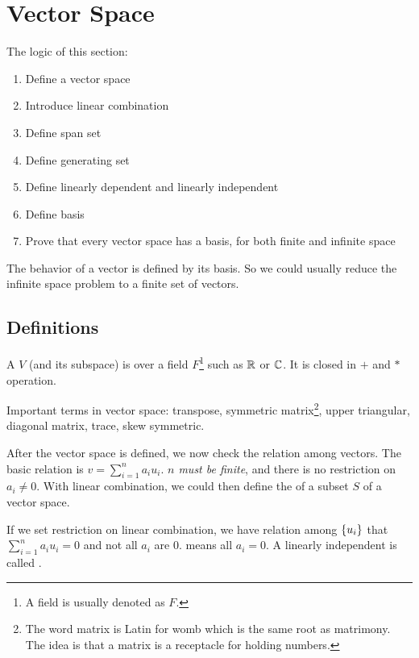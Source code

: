 \chapter{Vector Space}

The logic of this section:
\begin{enumerate}
    \item Define a vector space
    \item Introduce linear combination
    \item Define span set
    \item Define generating set
    \item Define linearly dependent and linearly independent
    \item Define basis
    \item Prove that every vector space has a basis, for both finite and infinite space
\end{enumerate}


The behavior of a vector is defined by its basis. So we could usually reduce the infinite space problem to a finite set of vectors.

\section{Definitions}

\begin{definition}
    A  $V$ (and its subspace) is over a field $F$\footnote{A field is usually denoted as $F$.} such as $\mathbb{R}$ or $\mathbb{C}$. It is closed in $+$ and $*$ operation.
\end{definition}


Important terms in vector space: transpose, symmetric matrix\footnote{The word matrix is Latin for womb which is the same root as matrimony. The idea is that a matrix is a receptacle for holding numbers.}, upper triangular, diagonal matrix, trace, skew symmetric.

After the vector space is defined, we now check the relation among vectors. The basic relation is  $v = \sum_{i=1}^{n} a_i u_i$. \emph{$n$ must be finite}, and there is no restriction on $a_i \neq 0$. With linear combination, we could then define the  of a subset $S$ of a vector space.

If we set restriction on linear combination, we have  relation among $\set{u_i}$ that $\sum_{i=1}^{n} a_i u_i = 0$ and not all $a_i$ are $0$.  means all $a_i = 0$. A linearly independent  is called .



